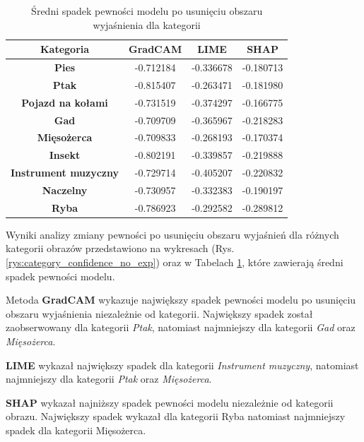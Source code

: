 \begin{table}[h]
	\centering
	\begin{tabular}{|c|c|c|c|}
		\hline
		\textbf{Kategoria}           & \textbf{GradCAM} & \textbf{LIME} & \textbf{SHAP} \\
		\hline
		\textbf{Pies}                & -0.712184        & -0.336678     & -0.180713     \\
		\hline
		\textbf{Ptak}                & -0.815407        & -0.263471     & -0.181980     \\
		\hline
		\textbf{Pojazd na kołami}    & -0.731519        & -0.374297     & -0.166775     \\
		\hline
		\textbf{Gad}                 & -0.709709        & -0.365967     & -0.218283     \\
		\hline
		\textbf{Mięsożerca}          & -0.709833        & -0.268193     & -0.170374     \\
		\hline
		\textbf{Insekt}              & -0.802191        & -0.339857     & -0.219888     \\
		\hline
		\textbf{Instrument muzyczny} & -0.729714        & -0.405207     & -0.220832     \\
		\hline
		\textbf{Naczelny}            & -0.730957        & -0.332383     & -0.190197     \\
		\hline
		\textbf{Ryba}                & -0.786923        & -0.292582     & -0.289812     \\
		\hline
	\end{tabular}
	\caption{Średni spadek pewności modelu po usunięciu obszaru wyjaśnienia dla kategorii}
	\label{tab:category_confidence_no_exp}
\end{table}

Wyniki analizy zmiany pewności po usunięciu obszaru wyjaśnień dla różnych kategorii obrazów przedstawiono na wykresach (Rys. \ref{rys:category_confidence_no_exp}) oraz w Tabelach \ref{tab:category_confidence_no_exp}, które zawierają średni spadek pewności modelu.

Metoda \textbf{GradCAM} wykazuje największy spadek pewności modelu po usunięciu obszaru wyjaśnienia niezależnie od kategorii.
Największy spadek został zaobserwowany dla kategorii \textit{Ptak}, natomiast najmniejszy dla kategorii \textit{Gad} oraz \textit{Mięsożerca}.

\textbf{LIME} wykazał największy spadek dla kategorii \textit{Instrument muzyczny}, natomiast najmniejszy dla kategorii \textit{Ptak} oraz \textit{Mięsożerca}.

\textbf{SHAP} wykazał najniższy spadek pewności modelu niezależnie od kategorii obrazu.
Największy spadek wykazał dla kategorii Ryba natomiast najmniejszy spadek dla kategorii Mięsożerca.

